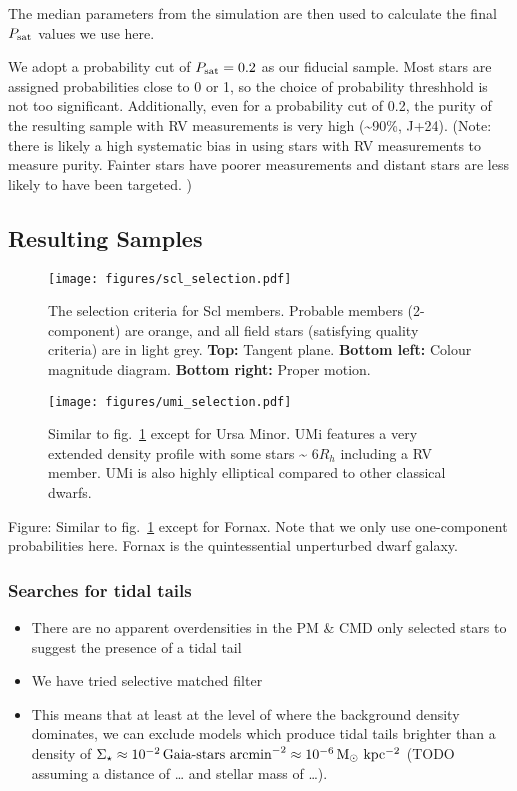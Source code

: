 The median parameters from the simulation are then used to calculate the
final \(P_{\rm sat}\) values we use here.

We adopt a probability cut of \(P_{\rm sat} = 0.2\) as our fiducial
sample. Most stars are assigned probabilities close to 0 or 1, so the
choice of probability threshhold is not too significant. Additionally,
even for a probability cut of 0.2, the purity of the resulting sample
with RV measurements is very high (\textasciitilde90\%, J+24). (Note:
there is likely a high systematic bias in using stars with RV
measurements to measure purity. Fainter stars have poorer measurements
and distant stars are less likely to have been targeted. )

\subsection{Resulting Samples}\label{resulting-samples}

\begin{figure}
\centering
\texttt{[image: figures/scl\_selection.pdf]}
\caption[Sculptor selection criteria]{The selection criteria for Scl
members. Probable members (2-component) are orange, and all field stars
(satisfying quality criteria) are in light grey. \textbf{Top:} Tangent
plane. \textbf{Bottom left:} Colour magnitude diagram. \textbf{Bottom
right:} Proper motion.}\label{fig:sculptor_selection}
\end{figure}

\begin{figure}
\centering
\texttt{[image: figures/umi\_selection.pdf]}
\caption[Ursa Minor Selection]{Similar to
fig.~\ref{fig:sculptor_selection} except for Ursa Minor. UMi features a
very extended density profile with some stars \textasciitilde{} 6\(R_h\)
including a RV member. UMi is also highly elliptical compared to other
classical dwarfs.}\label{fig:umi_selection}
\end{figure}

Figure: Similar to fig.~\ref{fig:sculptor_selection} except for Fornax.
Note that we only use one-component probabilities here. Fornax is the
quintessential unperturbed dwarf galaxy.

\subsubsection{Searches for tidal tails}\label{searches-for-tidal-tails}

\begin{itemize}
\item
  There are no apparent overdensities in the PM \& CMD only selected
  stars to suggest the presence of a tidal tail
\item
  We have tried selective matched filter
\item
  This means that at least at the level of where the background density
  dominates, we can exclude models which produce tidal tails brighter
  than a density of
  \(\Sigma_\star \approx 10^{-2}\,\text{Gaia-stars\ arcmin}^{-2} \approx 10^{-6} \, {\rm M_\odot\ kpc^{-2}}\)
  (TODO assuming a distance of \ldots{} and stellar mass of \ldots).
\end{itemize}


